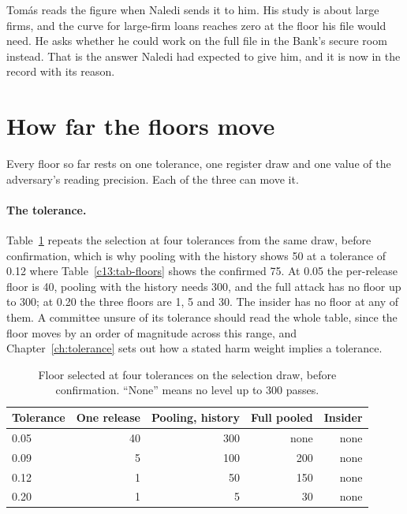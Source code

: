Tomás reads the figure when Naledi sends it to him. His study is about large firms,
and the curve for large-firm loans reaches zero at the floor his file would need. He
asks whether he could work on the full file in the Bank's secure room instead. That
is the answer Naledi had expected to give him, and it is now in the record with its
reason.

\section{How far the floors move}\label{c13:sec-sensitivity}

Every floor so far rests on one tolerance, one register draw and one value of the
adversary's reading precision. Each of the three can move it.

\paragraph{The tolerance.} Table~\ref{c13:tab-tol} repeats the selection at four
tolerances from the same draw, before confirmation, which is why pooling with the
history shows 50 at a tolerance of 0.12 where Table~\ref{c13:tab-floors} shows the
confirmed 75. At 0.05 the per-release floor is 40, pooling with the history needs 300,
and the full attack has no floor up to 300; at 0.20 the three floors are 1, 5 and 30.
The insider has no floor at any of them. A committee unsure of its tolerance should
read the whole table, since the floor moves by an order of magnitude across this
range, and Chapter~\ref{ch:tolerance} sets out how a stated harm weight implies a
tolerance.

\begin{table}[ht]
\centering
\caption{Floor selected at four tolerances on the selection draw, before
confirmation. ``None'' means no level up to 300 passes.}
\label{c13:tab-tol}
\small
\begin{tabular}{lrrrr}
\toprule
Tolerance & One release & Pooling, history & Full pooled & Insider \\
\midrule
0.05 & 40 & 300 & none & none \\
0.09 & 5  & 100 & 200  & none \\
0.12 & 1  & 50  & 150  & none \\
0.20 & 1  & 5   & 30   & none \\
\bottomrule
\end{tabular}
\end{table}

